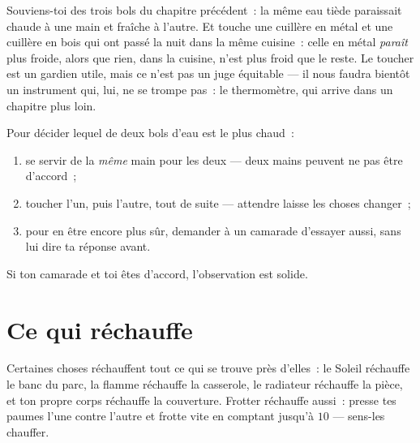 \begin{remark}\label{rem:g1:hot-and-cold:fooled}
Souviens-toi des trois bols du chapitre précédent~: la même eau tiède
paraissait chaude à une main et fraîche à l'autre. Et touche une
cuillère en métal et une cuillère en bois qui ont passé la nuit dans
la même cuisine~: celle en métal \emph{paraît} plus froide, alors que
rien, dans la cuisine, n'est plus froid que le reste. Le toucher est
un gardien utile, mais ce n'est pas un juge équitable --- il nous
faudra bientôt un instrument qui, lui, ne se trompe pas~: le
thermomètre, qui arrive dans un chapitre plus loin.
\end{remark}

\begin{method}\label{met:g1:hot-and-cold:compare}
Pour décider lequel de deux bols d'eau est le plus chaud~:
\begin{enumerate}
  \item se servir de la \emph{même} main pour les deux --- deux mains
        peuvent ne pas être d'accord~;
  \item toucher l'un, puis l'autre, tout de suite --- attendre laisse
        les choses changer~;
  \item pour en être encore plus sûr, demander à un camarade
        d'essayer aussi, sans lui dire ta réponse avant.
\end{enumerate}
Si ton camarade et toi êtes d'accord, l'observation est solide.
\end{method}

\section{Ce qui réchauffe}

\begin{example}\label{ex:g1:hot-and-cold:warmers}
Certaines choses réchauffent tout ce qui se trouve près d'elles~: le
Soleil réchauffe le banc du parc, la flamme réchauffe la casserole,
le radiateur réchauffe la pièce, et ton propre corps réchauffe la
couverture. Frotter réchauffe aussi~: presse tes paumes l'une contre
l'autre et frotte vite en comptant jusqu'à $10$ --- sens-les
chauffer.
\end{example}

